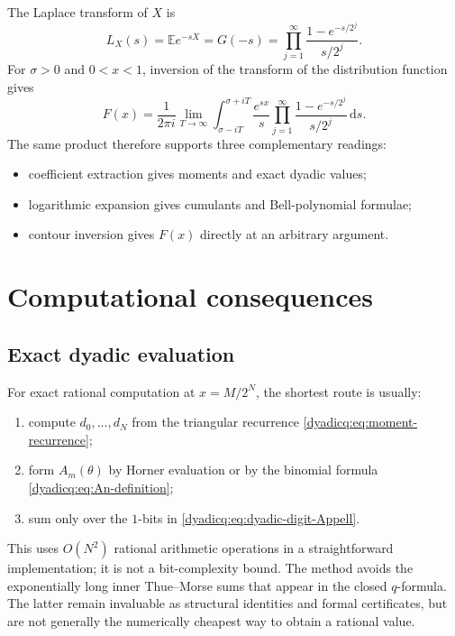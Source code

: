 \documentclass[11pt,oneside]{article}
\theoremstyle{definition}
\theoremstyle{remark}
\newcommand{\dd}{\,\mathrm d}
\newcommand{\E}{\mathbb E}
\begin{document}
The Laplace transform of $X$ is
\begin{equation}\label{dyadicq:eq:LX}
 L_X(s)=\E e^{-sX}=G(-s)
 =\prod_{j=1}^{\infty}
 \frac{1-e^{-s/2^j}}{s/2^j}.
\end{equation}
For $\sigma>0$ and $0<x<1$, inversion of the transform of the distribution
function gives
\begin{equation}\label{dyadicq:eq:Bromwich}
 \boxed{
 F(x)=\frac1{2\pi i}
 \lim_{T\to\infty}
 \int_{\sigma-iT}^{\sigma+iT}
 \frac{e^{sx}}{s}
 \prod_{j=1}^{\infty}
 \frac{1-e^{-s/2^j}}{s/2^j}\dd s.}
\end{equation}
The same product therefore supports three complementary readings:
\begin{itemize}
\item coefficient extraction gives moments and exact dyadic values;
\item logarithmic expansion gives cumulants and Bell-polynomial formulae;
\item contour inversion gives $F(x)$ directly at an arbitrary argument.
\end{itemize}

\section{Computational consequences}

\subsection{Exact dyadic evaluation}

For exact rational computation at $x=M/2^N$, the shortest route is usually:

\begin{enumerate}
\item compute $d_0,\ldots,d_N$ from the triangular recurrence
  \eqref{dyadicq:eq:moment-recurrence};
\item form $A_m(\theta)$ by Horner evaluation or by the binomial formula
  \eqref{dyadicq:eq:An-definition};
\item sum only over the $1$-bits in \eqref{dyadicq:eq:dyadic-digit-Appell}.
\end{enumerate}

This uses $O(N^2)$ rational arithmetic operations in a straightforward implementation; it
is not a bit-complexity bound.  The method
avoids the exponentially long inner Thue--Morse sums that appear in the
closed $q$-formula.  The latter remain invaluable as structural identities and
formal certificates, but are not generally the numerically cheapest way to
obtain a rational value.
\end{document}
